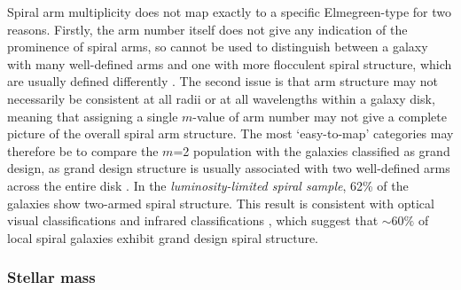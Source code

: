 \documentclass[useAMS,usenatbib]{mn2e}
\begin{document}
Spiral arm multiplicity does not map exactly to a specific Elmegreen-type for two reasons. Firstly, the arm number itself does not give any indication of the prominence of spiral arms, so cannot be used to distinguish between a galaxy with many well-defined arms and one with more flocculent spiral structure, which are usually defined differently \citep{EE_82,EE_87}. The second issue is that arm structure may not necessarily be consistent at all radii \citep{Grosbol_04} or at all wavelengths \citep{Block_91,Block_94,Thornley_96} within a galaxy disk, meaning that assigning a single $m$-value of arm number may not give a complete picture of the overall spiral arm structure. The most `easy-to-map' categories may therefore be to compare the $m$=2 population with the galaxies classified as grand design, as grand design structure is usually associated with two well-defined arms across the entire disk \citep{EE_82}. In the \textit{luminosity-limited spiral sample}, 62\% of the galaxies show two-armed spiral structure. This result is consistent with optical visual classifications \citep{EE_82} and infrared classifications \citep{Grosbol_04}, which suggest that $\sim 60\%$ of local spiral galaxies exhibit grand design spiral structure. 

\subsubsection{Stellar mass}
\label{sec:mass}
\end{document}
